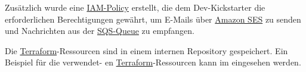 Zusätzlich wurde eine \hyperlink{SES}{\textcolor{AOBlau}{IAM-Policy}} erstellt, die dem Dev-Kickstarter die erforderlichen Berechtigungen gewährt, um E-Mails über \hyperlink{SES}{\textcolor{AOBlau}{Amazon SES}} zu senden und Nachrichten aus der \hyperlink{SQS}{\textcolor{AOBlau}{SQS-Queue}} zu empfangen. 

Die \hyperlink{Terraform}{\textcolor{AOBlau}{Terraform}}-Ressourcen sind in einem internen Repository gespeichert. Ein Beispiel für die verwendet-
en \hyperlink{Terraform}{\textcolor{AOBlau}{Terraform}}-Ressourcen kann im  eingesehen werden.
